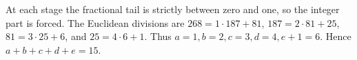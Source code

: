 At each stage the fractional tail is strictly between zero and one, so the integer part is forced. The Euclidean divisions are $268=1\cdot187+81$, $187=2\cdot81+25$, $81=3\cdot25+6$, and $25=4\cdot6+1$. Thus $a=1,b=2,c=3,d=4,e+1=6$. Hence $a+b+c+d+e=\boxed{15}$.
